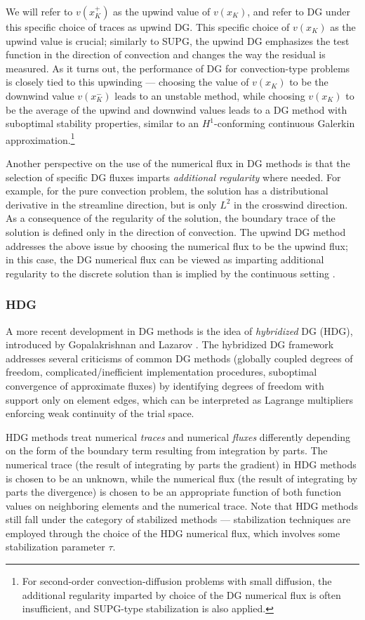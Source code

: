 We will refer to $v(x_K^+)$ as the upwind value of $v(x_K)$, and refer to DG under this specific choice of traces as upwind DG.  This specific choice of $v(x_K)$ as the upwind value is crucial; similarly to SUPG, the upwind DG emphasizes the test function in the direction of convection and changes the way the residual is measured.  As it turns out, the performance of DG for convection-type problems is closely tied to this upwinding --- choosing the value of $v(x_K)$ to be the downwind value $v(x_K^-)$ leads to an unstable method, while choosing $v(x_K)$ to be the average of the upwind and downwind values leads to a DG method with suboptimal stability properties, similar to an $H^1$-conforming continuous Galerkin approximation\cite{Brezzi20063293}.\footnote{For second-order convection-diffusion problems with small diffusion, the additional regularity imparted by choice of the DG numerical flux is often insufficient, and SUPG-type stabilization is also applied.}

Another perspective on the use of the numerical flux in DG methods is that the selection of specific DG fluxes imparts \emph{additional regularity} where needed.  For example, for the pure convection problem, the solution has a distributional derivative in the streamline direction, but is only $L^2$ in the crosswind direction. As a consequence of the regularity of the solution, the boundary trace of the solution is defined only in the direction of convection. The upwind DG method addresses the above issue by choosing the numerical flux to be the upwind flux; in this case, the DG numerical flux can be viewed as imparting additional regularity to the discrete solution than is implied by the continuous setting \cite{DPG1,DPG3}.  

\subsubsection{HDG}

A more recent development in DG methods is the idea of \emph{hybridized} DG (HDG), introduced by Gopalakrishnan and Lazarov \cite{hybridDG}. The hybridized DG framework addresses several criticisms of common DG methods (globally coupled degrees of freedom, complicated/inefficient implementation procedures, suboptimal convergence of approximate fluxes) by identifying degrees of freedom with support only on element edges, which can be interpreted as Lagrange multipliers enforcing weak continuity of the trial space. 

HDG methods treat numerical \emph{traces} and numerical \emph{fluxes} differently depending on the form of the boundary term resulting from integration by parts. The numerical trace (the result of integrating by parts the gradient) in HDG methods is chosen to be an unknown, while the numerical flux (the result of integrating by parts the divergence) is chosen to be an appropriate function of both function values on neighboring elements and the numerical trace. Note that HDG methods still fall under the category of stabilized methods --- stabilization techniques are employed through the choice of the HDG numerical flux, which involves some stabilization parameter $\tau$. 

